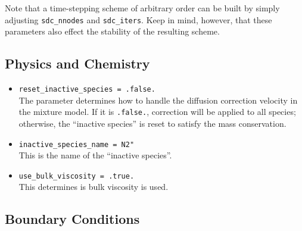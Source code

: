 \documentclass[11pt,letterpaper]{article}
\begin{document}
Note that a time-stepping scheme of arbitrary order can be built by
simply adjusting {\tt sdc\_nnodes} and {\tt sdc\_iters}.  Keep in
mind, however, that these parameters also effect the stability of the
resulting scheme.

\subsection{Physics and Chemistry}
\begin{itemize}
\item {\tt reset\_inactive\_species = .false.}\\
  The parameter determines how to handle the diffusion correction
  velocity in the mixture model.  If it is {\tt .false.}, correction
  will be applied to all species; otherwise, the ``inactive species''
  is reset to satisfy the mass conservation.
\item {\tt inactive\_species\_name = N2"}\\
  This is the name of the ``inactive species''.
\item {\tt use\_bulk\_viscosity = .true.}\\
  This determines is bulk viscosity is used.
\end{itemize}


\subsection{Boundary Conditions}
\end{document}
